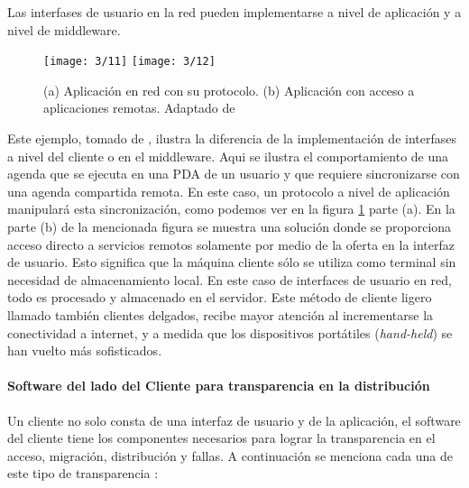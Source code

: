      Las interfases de usuario en la red pueden implementarse a nivel de aplicación y a nivel de middleware.
	
	 \begin{figure} %
		\texttt{[image: 3/11]}
		\texttt{[image: 3/12]}
		\caption{(a) Aplicación en red con su protocolo. (b) Aplicación con acceso a  aplicaciones remotas. Adaptado de \ST}
		\label{fig:Clientes-Hilos}
	\end{figure}
	 
	
	Este ejemplo,  tomado de , ilustra la diferencia de la implementación de interfases a nivel del cliente o en el middleware. Aqui se ilustra el comportamiento de una agenda que se ejecuta en una PDA de un usuario  y que requiere sincronizarse con una agenda compartida remota. En este caso, un protocolo a nivel de aplicación manipulará esta sincronización, como podemos ver en la figura \ref{fig:Clientes-Hilos} parte (a). En la parte (b) de la mencionada figura se muestra una  solución donde se proporciona acceso directo a servicios remotos solamente por medio de la oferta en la interfaz de usuario. Esto significa que la máquina cliente sólo se utiliza como terminal sin necesidad de almacenamiento local. En este caso de interfaces de usuario en red, todo es procesado y almacenado en el servidor. Este método de \gls{cliente ligero} llamado también clientes delgados, recibe mayor atención al incrementarse la conectividad a internet, y a medida que los  dispositivos portátiles (\textit{hand-held}) se han vuelto más sofisticados. 
	
	
	\paragraph{Software del lado del Cliente para transparencia en la distribución}   
	  Un cliente no solo consta de una  interfaz de usuario y de la aplicación, el software   del cliente tiene los componentes necesarios para lograr la transparencia  en el acceso, migración, distribución y fallas. A continuación se menciona cada una de este tipo de transparencia :
	 
